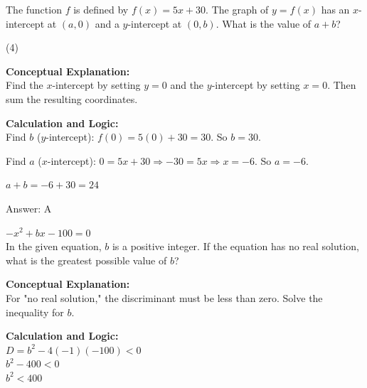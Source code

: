 \documentclass[11pt,paper=a4,answers]{exam}
\begin{document}
\begin{questions}
\question
The function $f$ is defined by $f(x) = 5x + 30$. The graph of $y = f(x)$ has an $x$-intercept at $(a, 0)$ and a $y$-intercept at $(0, b)$. What is the value of $a + b$?
\begin{tasks}(4)
\end{tasks}

\begin{solution}
\textbf{Conceptual Explanation:} \\
Find the $x$-intercept by setting $y=0$ and the $y$-intercept by setting $x=0$. Then sum the resulting coordinates.

\vspace{20pt}

\textbf{Calculation and Logic:} \\
Find $b$ ($y$-intercept): $f(0) = 5(0) + 30 = 30$. So $b = 30$.

\vspace{10pt}

Find $a$ ($x$-intercept): $0 = 5x + 30 \Rightarrow -30 = 5x \Rightarrow x = -6$. So $a = -6$.

\vspace{10pt}

$a + b = -6 + 30 = 24$

\vspace{25pt}

Answer: \colorbox{yellow!100}{A}
\end{solution}

\vspace{40pt}

\question
$-x^2 + bx - 100 = 0$ \\
In the given equation, $b$ is a positive integer. If the equation has no real solution, what is the greatest possible value of $b$?

\begin{solution}
\textbf{Conceptual Explanation:} \\
For "no real solution," the discriminant must be less than zero. Solve the inequality for $b$.

\vspace{20pt}

\textbf{Calculation and Logic:} \\
$D = b^2 - 4(-1)(-100) < 0$ \\
$b^2 - 400 < 0$ \\
$b^2 < 400$


\end{solution}
\end{questions}
\end{document}
